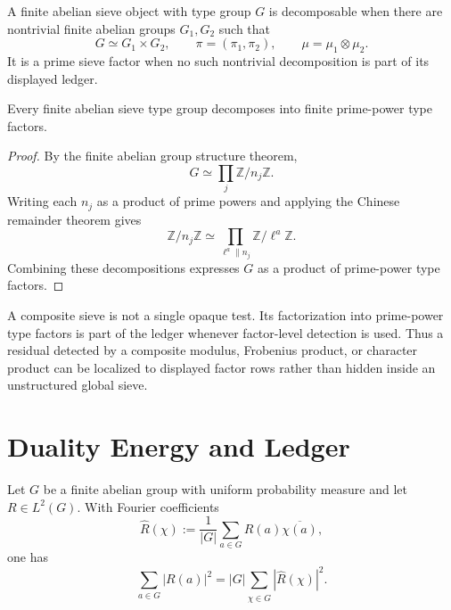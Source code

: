 \begin{definition}
\label{def:rh-composite-prime-sieve-factors}
A finite abelian sieve object with type group $G$ is decomposable when
there are nontrivial finite abelian groups $G_1,G_2$ such that
$$
G\simeq G_1\times G_2,
\qquad
\pi=(\pi_1,\pi_2),
\qquad
\mu=\mu_1\otimes\mu_2.
$$
It is a prime sieve factor when no such nontrivial decomposition is
part of its displayed ledger.
\end{definition}

\begin{theorem}
\label{thm:rh-finite-abelian-sieves-decompose-prime-power}
Every finite abelian sieve type group decomposes into finite
prime-power type factors.
\end{theorem}

\begin{proof}
By the finite abelian group structure theorem,
$$
G\simeq\prod_j\mathbb Z/n_j\mathbb Z.
$$
Writing each $n_j$ as a product of prime powers and applying the
Chinese remainder theorem gives
$$
\mathbb Z/n_j\mathbb Z
\simeq
\prod_{\ell^a\parallel n_j}\mathbb Z/\ell^a\mathbb Z.
$$
Combining these decompositions expresses $G$ as a product of
prime-power type factors.
\end{proof}

\begin{principle}
\label{prin:rh-composite-sieves-carry-factor-ledgers}
A composite sieve is not a single opaque test.  Its factorization into
prime-power type factors is part of the ledger whenever factor-level
detection is used.  Thus a residual detected by a composite modulus,
Frobenius product, or character product can be localized to displayed
factor rows rather than hidden inside an unstructured global sieve.
\end{principle}

\section{Duality Energy and Ledger}
\label{sec:rh-prime-sieve-tower-energy-ledger}

\begin{theorem}
\label{thm:rh-finite-fourier-sieve-coordinate-energy}
Let $G$ be a finite abelian group with uniform probability measure and
let $R\in L^2(G)$.  With Fourier coefficients
$$
\widehat R(\chi)
:=
\frac1{|G|}\sum_{a\in G}R(a)\overline{\chi(a)},
$$
one has
$$
\sum_{a\in G}|R(a)|^2
=
|G|\sum_{\chi\in\widehat G}|\widehat R(\chi)|^2.
$$
\end{theorem}

